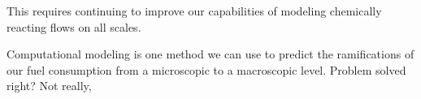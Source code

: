 \documentclass[smallextended,referee]{svjour3}
\begin{document}
This requires continuing to improve our capabilities of modeling chemically reacting flows on all scales. 

Computational modeling is one method we can use to predict the ramifications of our fuel consumption from a microscopic to a macroscopic level. Problem solved right? Not really,


\begin{acknowledgements}

\end{acknowledgements}

\appendix


% 
% 
\end{document}
